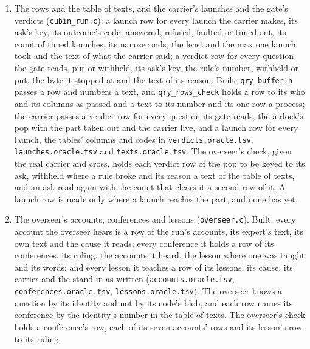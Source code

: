\begin{enumerate}
\begin{enumerate}
\item The rows and the table of texts, and the carrier's launches and the gate's verdicts (\texttt{cubin\_\allowbreak{}run.\allowbreak{}c}): a launch row for every launch the carrier makes, its ask's key, its outcome's code, answered, refused, faulted or timed out, its count of timed launches, its nanoseconds, the least and the max one launch took and the text of what the carrier said; a verdict row for every question the gate reads, put or withheld, its ask's key, the rule's number, withheld or put, the byte it stopped at and the text of its reason. Built: \texttt{qry\_\allowbreak{}buffer.\allowbreak{}h} passes a row and numbers a text, and \texttt{qry\_\allowbreak{}rows\_\allowbreak{}check} holds a row to its who and its columns as passed and a text to its number and its one row a process; the carrier passes a verdict row for every question its gate reads, the airlock's pop with the part taken out and the carrier live, and a launch row for every launch, the tables' columns and codes in \texttt{verdicts.\allowbreak{}oracle.\allowbreak{}tsv}, \texttt{launches.\allowbreak{}oracle.\allowbreak{}tsv} and \texttt{texts.\allowbreak{}oracle.\allowbreak{}tsv}. The overseer's check, given the real carrier and cross, holds each verdict row of the pop to be keyed to its ask, withheld where a rule broke and its reason a text of the table of texts, and an ask read again with the count that clears it a second row of it. A launch row is made only where a launch reaches the part, and none has yet.
\item The overseer's accounts, conferences and lessons (\texttt{overseer.\allowbreak{}c}). Built: every account the overseer hears is a row of the run's accounts, its expert's text, its own text and the cause it reads; every conference it holds a row of its conferences, its ruling, the accounts it heard, the lesson where one was taught and its words; and every lesson it teaches a row of its lessons, its cause, its carrier and the stand-in as written (\texttt{accounts.\allowbreak{}oracle.\allowbreak{}tsv}, \texttt{conferences.\allowbreak{}oracle.\allowbreak{}tsv}, \texttt{lessons.\allowbreak{}oracle.\allowbreak{}tsv}). The overseer knows a question by its identity and not by its code's blob, and each row names its conference by the identity's number in the table of texts. The overseer's check holds a conference's row, each of its seven accounts' rows and its lesson's row to its ruling.

\end{enumerate}
\end{enumerate}

